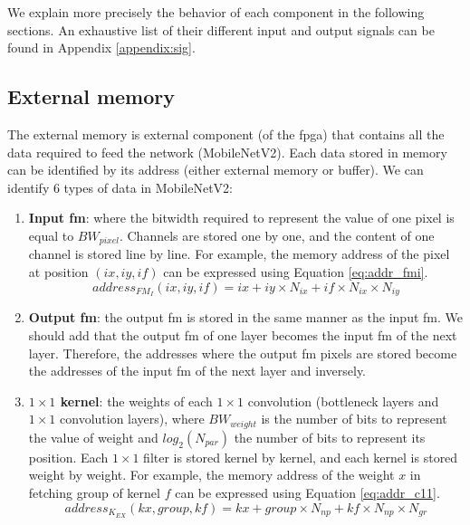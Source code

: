 We explain more precisely the behavior of each component in the following sections. An exhaustive list of their different input and output signals can be found in Appendix \ref{appendix:sig}.
%
\subsection{External memory} \label{subs:extmem}
%
The external memory is external component (of the \acrshort{fpga}) that contains all the data required to feed the network (MobileNetV2). Each data stored in memory can be identified by its address (either external memory or buffer). We can identify 6 types of data in MobileNetV2:
%
\begin{enumerate}
    \item \textbf{Input \acrshort{fm}}: where the bitwidth required to represent the value of one pixel is equal to $BW_{pixel}$. Channels are stored one by one, and the content of one channel is stored line by line. For example, the memory address of the pixel at position $\left(ix, iy, if\right)$ can be expressed using Equation \eqref{eq:addr_fmi}.
    \begin{equation}
        address_{FM_{I}}(ix, iy, if) = ix + iy \times N_{ix} + if \times N_{ix} \times N_{iy}
        \label{eq:addr_fmi}
    \end{equation}
    \item \textbf{Output \acrshort{fm}}: the output \acrshort{fm} is stored in the same manner as the input \acrshort{fm}. We should add that the output \acrshort{fm} of one layer becomes the input \acrshort{fm} of the next layer. Therefore, the addresses where the output \acrshort{fm} pixels are stored become the addresses of the input \acrshort{fm} of the next layer and inversely.
    \item \textbf{$1 \times 1$ kernel}: the weights of each $1 \times 1$ convolution (bottleneck layers and $1 \times 1$ convolution layers), where $BW_{weight}$ is the number of bits to represent the value of weight and $log_2(N_{par})$ the number of bits to represent its position. Each $1 \times 1$ filter is stored kernel by kernel, and each kernel is stored weight by weight. For example, the memory address of the weight $x$ in fetching group  of kernel $f$ can be expressed using Equation \eqref{eq:addr_c11}.
    \begin{equation}
        address_{K_{EX}}(kx, group, kf) = kx + group \times N_{np} + kf \times N_{np} \times N_{gr}
        \label{eq:addr_c11}
    \end{equation}

\end{enumerate}
